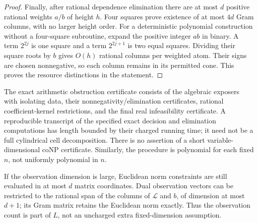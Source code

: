\begin{proof}
Finally, after rational dependence elimination there are at most $d$ positive rational weights $a/b$ of height $h$. Four squares prove existence of at most $4d$ Gram columns, with no larger height order. For a deterministic polynomial construction without a four-square subroutine, expand the positive integer $ab$ in binary. A term $2^{2j}$ is one square and a term $2^{2j+1}$ is two equal squares. Dividing their square roots by $b$ gives $O(h)$ rational columns per weighted atom. Their signs are chosen nonnegative, so each column remains in its permitted cone. This proves the resource distinctions in the statement.
\end{proof}

The exact arithmetic obstruction certificate consists of the algebraic exposers with isolating data, their nonnegativity/elimination certificates, rational coefficient-kernel restrictions, and the final real infeasibility certificate. A reproducible transcript of the specified exact decision and elimination computations has length bounded by their charged running time; it need not be a full cylindrical cell decomposition. There is no assertion of a short variable-dimensional coNP certificate. Similarly, the procedure is polynomial for each fixed $n$, not uniformly polynomial in $n$.

If the observation dimension is large, Euclidean norm constraints are still evaluated in at most $d$ matrix coordinates. Dual observation vectors can be restricted to the rational span of the columns of $\mathcal L$ and $b$, of dimension at most $d+1$; its Gram matrix retains the Euclidean norm exactly. Thus the observation count is part of $L$, not an uncharged extra fixed-dimension assumption.

